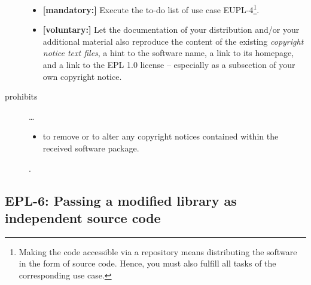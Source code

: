\begin{description}
\begin{itemize}
  \item \textbf{[mandatory:]} Execute the to-do list of use case EUPL-4\footnote{
  Making the code accessible via a repository means distributing the software in
  the form of source code. Hence, you must also fulfill all tasks of the
  corresponding use case.}.
 
  \item \textbf{[voluntary:]} Let the documentation of your distribution and/or
  your additional material  also reproduce the content of the existing
  \emph{copyright notice text files}, a hint to the software name, a link to its
  homepage, and a link to the EPL 1.0 license -- especially as a subsection of
  your own copyright notice.


\end{itemize}  

\item[prohibits] \ldots
\begin{itemize}
  \item to remove or to alter any copyright notices contained within the
  received software package.
\end{itemize}.

\end{description}

\subsection{EPL-6: Passing a modified library as independent source code}
\label{OSUC-08-EPL}

